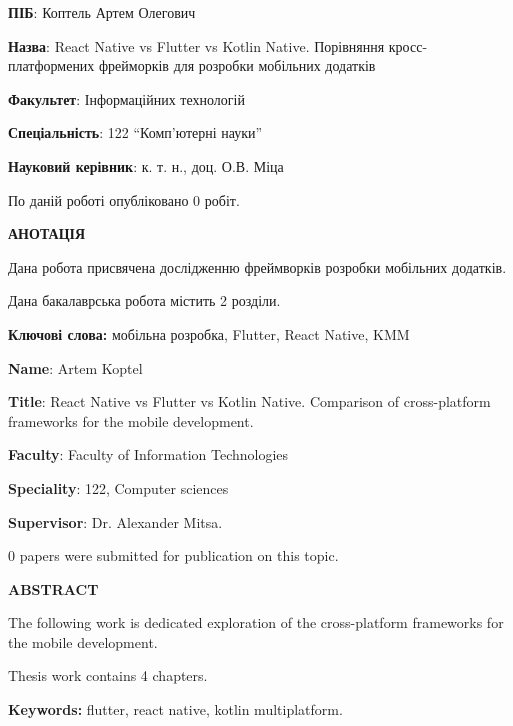 
\textbf{ПІБ}: Коптель Артем Олегович

\textbf{Назва}: React Native vs Flutter vs Kotlin Native. Порівняння кросс-платформених фрейморків для розробки мобільних додатків

\textbf{Факультет}: Інформаційних технологій

\textbf{Спеціальність}: 122 ``Комп'ютерні науки''

\textbf{Науковий керівник}: к. т. н., доц. О.В. Міца

По даній роботі опубліковано $0$ робіт.

\begin{center}
\textbf{АНОТАЦІЯ}
\end{center}

Дана робота присвячена дослідженню фреймворків розробки мобільних додатків.

Дана бакалаврська робота містить 2 розділи.

{\bf Ключові слова:} мобільна розробка, Flutter, React Native, KMM

\newpage

\textbf{Name}: Artem Koptel

\textbf{Title}: React Native vs Flutter vs Kotlin Native. Comparison of cross-platform frameworks for the mobile development.

\textbf{Faculty}: Faculty of Information Technologies

\textbf{Speciality}: 122, Computer sciences

\textbf{Supervisor}: Dr. Alexander Mitsa. 

$0$ papers were submitted for publication on this topic.

\begin{center}
\textbf{ABSTRACT}
\end{center}

The following work is dedicated exploration of the cross-platform frameworks for the mobile development.

Thesis work contains 4 chapters.

{\bf Keywords:} flutter, react native, kotlin multiplatform.

